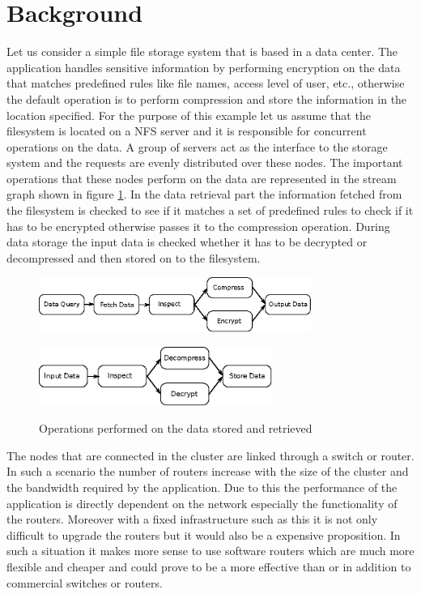 \documentclass[conference]{IEEEtran}
\begin{document}
\section{Background}

Let us consider a simple file storage system that is based in a data center. The application handles sensitive information by performing encryption on the data that matches predefined rules like file names, access level of user, etc., otherwise the default operation is to perform compression and store the information in the location specified. For the purpose of this example let us assume that the filesystem is located on a NFS server and it is responsible for concurrent operations on the data. A group of servers act as the interface to the storage system and the requests are evenly distributed over these nodes. The important operations that these nodes perform on the data are represented in the stream graph shown in figure \ref{fig1}. In the data retrieval part the information fetched from the filesystem is checked to see if it matches a set of predefined rules to check if it has to be encrypted otherwise passes it to the compression operation. During data storage the input data is checked whether it has to be decrypted or decompressed and then stored on to the filesystem.

\begin{figure}[ht]
\centering
\subfigure
{
	\includegraphics[width=3.5in]{ip-data-proc}
	\label{fig1.1}
}

\subfigure
{
	\includegraphics[width=3in]{op-data-proc}
	\label{fig1.2}
}
\caption{Operations performed on the data stored and retrieved}
\label{fig1}
\end{figure}

The nodes that are connected in the cluster are linked through a switch or router. In such a scenario the number of routers increase with the size of the cluster and the bandwidth required by the application. Due to this the performance of the application is directly dependent on the network especially the functionality of the routers. Moreover with a fixed infrastructure such as this it is not only difficult to upgrade the routers but it would also be a expensive proposition. In such a situation it makes more sense to use software routers which are much more flexible and cheaper and could prove to be a more effective than or in addition to commercial switches or routers.
\end{document}
